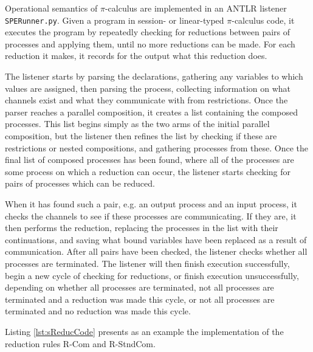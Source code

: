 \documentclass{l4proj}
\begin{document}
\quad Operational semantics of $\pi$-calculus are implemented in an ANTLR listener \texttt{SPERunner.py}. Given a program in session- or linear-typed $\pi$-calculus code, it executes the program by repeatedly checking for reductions between pairs of processes and applying them, until no more reductions can be made. For each reduction it makes, it records for the output what this reduction does.

\quad The listener starts by parsing the declarations, gathering any variables to which values are assigned, then parsing the process, collecting information on what channels exist and what they communicate with from restrictions. Once the parser reaches a parallel composition, it creates a list containing the composed processes. This list begins simply as the two arms of the initial parallel composition, but the listener then refines the list by checking if these are restrictions or nested compositions, and gathering processes from these. Once the final list of composed processes has been found, where all of the processes are some process on which a reduction can occur, the listener starts checking for pairs of processes which can be reduced. 

\quad When it has found such a pair, e.g. an output process and an input process, it checks the channels to see if these processes are communicating. If they are, it then performs the reduction, replacing the processes in the list with their continuations, and saving what bound variables have been replaced as a result of communication. After all pairs have been checked, the listener checks whether all processes are terminated. The listener will then finish execution successfully, begin a new cycle of checking for reductions, or finish execution unsuccessfully, depending on whether all processes are terminated, not all processes are terminated and a reduction was made this cycle, or not all processes are terminated and no reduction was made this cycle.

Listing \ref{lst:sReducCode} presents as an example the implementation of the reduction rules R-Com and R-StndCom.
\end{document}
